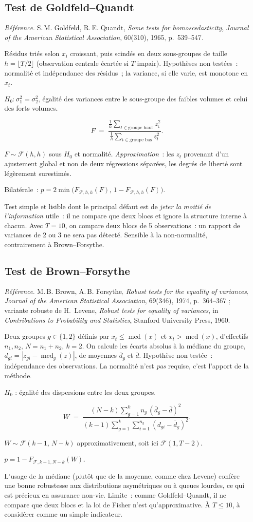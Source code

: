 \documentclass[a4paper,11pt]{article}
\newcommand{\refl}[1]{{\small\textcolor{maincolor!70!black}{\textit{Référence.} #1}}\par\smallskip}
\newcounter{ficheid}
\newenvironment{fiche}[1]{%
  \stepcounter{ficheid}%
  \phantomsection
  \subsection{#1}%
  \label{fiche:\theficheid}%
}{%
  \end{description}\vspace{0.5em}%
}
\newcommand{\Cadre}{%
  \begin{description}[leftmargin=0pt, style=unboxed, itemsep=3pt, topsep=3pt, parsep=2pt]%
  \item[\textcolor{financeblue}{\textbf{1. Cadre, notations et hypothèses de validité (non testées).}}]}
\newcommand{\Hzero}{\item[\textcolor{financeblue}{\textbf{2. Hypothèse nulle.}}]}
\newcommand{\Stat}{\item[\textcolor{financeblue}{\textbf{3. Statistique de test.}}]}
\newcommand{\Loi}{\item[\textcolor{financeblue}{\textbf{4. Loi sous $H_0$.}}]}
\newcommand{\Pval}{\item[\textcolor{financeblue}{\textbf{5. p-value.}}]}
\newcommand{\Usage}{\item[\textcolor{financeblue}{\textbf{6. Usage et limites.}}]}
\begin{document}
\begin{fiche}{Test de Goldfeld--Quandt}
\refl{S.\,M. Goldfeld, R.\,E. Quandt, \emph{Some tests for homoscedasticity}, \emph{Journal of
the American Statistical Association}, 60(310), 1965, p.~539--547.}
\Cadre
Résidus triés selon $x_t$ croissant, puis scindés en deux sous-groupes de taille
$h = \lfloor T/2 \rfloor$ (observation centrale écartée si $T$ impair). Hypothèses non testées~:
normalité et indépendance des résidus~; la variance, si elle varie, est monotone en $x_t$.
\Hzero
$H_0 : \sigma_1^2 = \sigma_2^2$, égalité des variances entre le sous-groupe des faibles volumes et
celui des forts volumes.
\Stat
\[
  F \;=\; \frac{\frac{1}{h}\sum_{t \in \text{groupe haut}} z_t^2}
               {\frac{1}{h}\sum_{t \in \text{groupe bas}} z_t^2}.
\]
\Loi
$F \sim \mathcal{F}(h, h)$ sous $H_0$ et normalité. \emph{Approximation}~: les $z_t$ provenant
d'un ajustement global et non de deux régressions séparées, les degrés de liberté sont légèrement
surestimés.
\Pval
Bilatérale~: $p = 2\min\big(F_{\mathcal{F},h,h}(F),\, 1 - F_{\mathcal{F},h,h}(F)\big)$.
\Usage
Test simple et lisible dont le principal défaut est de \emph{jeter la moitié de l'information}
utile~: il ne compare que deux blocs et ignore la structure interne à chacun. Avec $T = 10$, on
compare deux blocs de 5 observations~: un rapport de variances de 2 ou 3 ne sera pas détecté.
Sensible à la non-normalité, contrairement à Brown--Forsythe.
\end{fiche}

\begin{fiche}{Test de Brown--Forsythe}
\refl{M.\,B. Brown, A.\,B. Forsythe, \emph{Robust tests for the equality of variances},
\emph{Journal of the American Statistical Association}, 69(346), 1974, p.~364--367 ; variante
robuste de H.~Levene, \emph{Robust tests for equality of variances}, in \emph{Contributions to
Probability and Statistics}, Stanford University Press, 1960.}
\Cadre
Deux groupes $g \in \{1,2\}$ définis par $x_t \le \operatorname{med}(x)$ et
$x_t > \operatorname{med}(x)$, d'effectifs $n_1, n_2$, $N = n_1+n_2$, $k=2$. On calcule les écarts
absolus à la médiane du groupe, $d_{gi} = |z_{gi} - \operatorname{med}_g(z)|$, de moyennes
$\bar d_g$ et $\bar d$. Hypothèse non testée~: indépendance des observations. La normalité n'est
\emph{pas} requise, c'est l'apport de la méthode.
\Hzero
$H_0$ : égalité des dispersions entre les deux groupes.
\Stat
\[
  W \;=\; \frac{(N-k)\sum_{g=1}^{k} n_g\,(\bar d_g - \bar d)^2}
                {(k-1)\sum_{g=1}^{k}\sum_{i=1}^{n_g} (d_{gi} - \bar d_g)^2}.
\]
\Loi
$W \sim \mathcal{F}(k-1,\,N-k)$ approximativement, soit ici $\mathcal{F}(1, T-2)$.
\Pval
$p = 1 - F_{\mathcal{F},k-1,N-k}(W)$.
\Usage
L'usage de la médiane (plutôt que de la moyenne, comme chez Levene) confère une bonne robustesse
aux distributions asymétriques ou à queues lourdes, ce qui est précieux en assurance non-vie.
Limite~: comme Goldfeld--Quandt, il ne compare que deux blocs et la loi de Fisher n'est
qu'approximative. À $T \le 10$, à considérer comme un simple indicateur.
\end{fiche}
\end{document}
